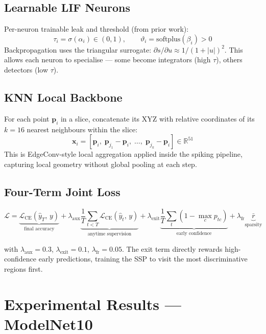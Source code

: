 \documentclass[11pt,a4paper]{article}
\begin{document}
\subsection{Learnable LIF Neurons}

Per-neuron trainable leak and threshold (from prior work):
\[
  \tau_i = \sigma(\alpha_i)\in(0,1), \qquad \vartheta_i = \text{softplus}(\beta_i)>0
\]
Backpropagation uses the triangular surrogate: $\partial s/\partial u \approx 1/(1+|u|)^2$.
This allows each neuron to specialise --- some become integrators (high $\tau$), others detectors (low $\tau$).

\subsection{KNN Local Backbone}

For each point $\mathbf{p}_i$ in a slice, concatenate its XYZ with relative coordinates of
its $k=16$ nearest neighbours within the slice:
\[
  \mathbf{x}_i = [\mathbf{p}_i,\; \mathbf{p}_{j_1}-\mathbf{p}_i,\;\ldots,\;\mathbf{p}_{j_k}-\mathbf{p}_i] \in \mathbb{R}^{51}
\]
This is EdgeConv-style local aggregation applied inside the spiking pipeline, capturing local geometry without global pooling at each step.

\subsection{Four-Term Joint Loss}

\[
  \mathcal{L} = \underbrace{\mathcal{L}_{\text{CE}}(\hat{y}_T,\, y)}_{\text{final accuracy}}
  + \lambda_{\text{aux}} \underbrace{\frac{1}{T}\sum_{t<T}\mathcal{L}_{\text{CE}}(\hat{y}_t,\, y)}_{\text{anytime supervision}}
  + \lambda_{\text{exit}} \underbrace{\frac{1}{T}\sum_t (1 - \max_c p_{tc})}_{\text{early confidence}}
  + \lambda_{\text{fr}} \underbrace{\bar{r}}_{\text{sparsity}}
\]

with $\lambda_{\text{aux}}=0.3$, $\lambda_{\text{exit}}=0.1$, $\lambda_{\text{fr}}=0.05$.
The exit term directly rewards high-confidence early predictions, training the SSP to visit the most discriminative regions first.

\section{Experimental Results --- ModelNet10}
\end{document}
